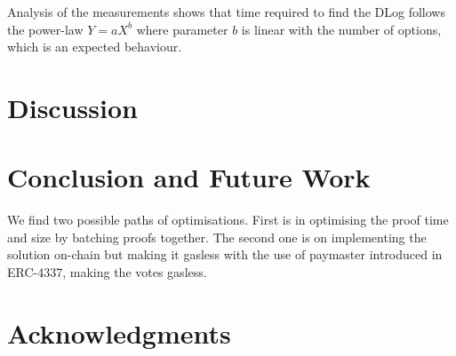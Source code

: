 \documentclass{article}
\begin{document}
Analysis of the measurements shows that time required to find the DLog follows the power-law $Y=aX^b$ where parameter $b$ is linear with the number of options, which is an expected behaviour.


\section{Discussion}

\section{Conclusion and Future Work}

We find two possible paths of optimisations. First is in optimising the proof time and size by batching proofs together. 
The second one is on implementing the solution on-chain but making it gasless with the use of paymaster introduced in ERC-4337, making the votes gasless.

\section{Acknowledgments}




\end{document}
